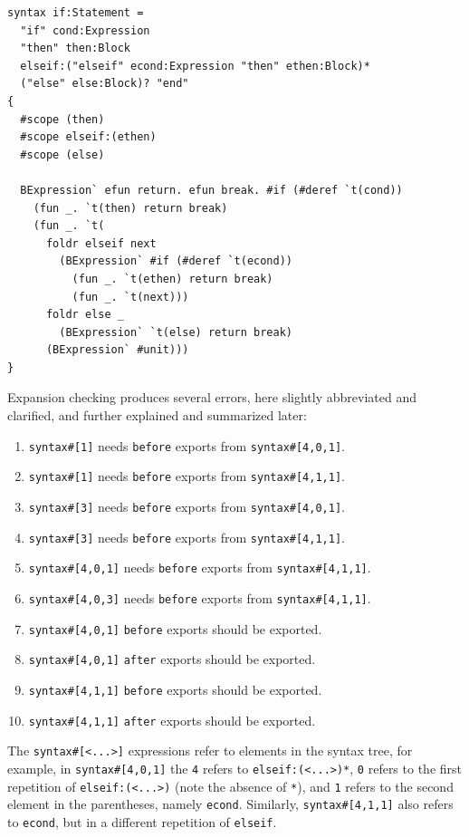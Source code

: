 \documentclass{kththesis}
\begin{document}
\begin{verbatim}
syntax if:Statement =
  "if" cond:Expression
  "then" then:Block
  elseif:("elseif" econd:Expression "then" ethen:Block)*
  ("else" else:Block)? "end"
{
  #scope (then)
  #scope elseif:(ethen)
  #scope (else)

  BExpression` efun return. efun break. #if (#deref `t(cond))
    (fun _. `t(then) return break)
    (fun _. `t(
      foldr elseif next
        (BExpression` #if (#deref `t(econd))
          (fun _. `t(ethen) return break)
          (fun _. `t(next)))
      foldr else _
        (BExpression` `t(else) return break)
      (BExpression` #unit)))
}
\end{verbatim}

Expansion checking produces several errors, here slightly abbreviated and clarified, and further explained and summarized later:
\begin{enumerate}
  \item \texttt{syntax#[1]} needs \texttt{before} exports from \texttt{syntax#[4,0,1]}.
  \item \texttt{syntax#[1]} needs \texttt{before} exports from \texttt{syntax#[4,1,1]}.
  \item \texttt{syntax#[3]} needs \texttt{before} exports from \texttt{syntax#[4,0,1]}.
  \item \texttt{syntax#[3]} needs \texttt{before} exports from \texttt{syntax#[4,1,1]}.
  \item \texttt{syntax#[4,0,1]} needs \texttt{before} exports from \texttt{syntax#[4,1,1]}.
  \item \texttt{syntax#[4,0,3]} needs \texttt{before} exports from \texttt{syntax#[4,1,1]}.
  \item \texttt{syntax#[4,0,1]} \texttt{before} exports should be exported.
  \item \texttt{syntax#[4,0,1]} \texttt{after} exports should be exported.
  \item \texttt{syntax#[4,1,1]} \texttt{before} exports should be exported.
  \item \texttt{syntax#[4,1,1]} \texttt{after} exports should be exported.
\end{enumerate}

The \texttt{syntax#[<...>]} expressions refer to elements in the syntax tree, for example, in \texttt{syntax#[4,0,1]} the \texttt{4} refers to \texttt{elseif:(<...>)*}, \texttt{0} refers to the first repetition of \texttt{elseif:(<...>)} (note the absence of \texttt{*}), and \texttt{1} refers to the second element in the parentheses, namely \texttt{econd}. Similarly, \texttt{syntax#[4,1,1]} also refers to \texttt{econd}, but in a different repetition of \texttt{elseif}.
\end{document}
